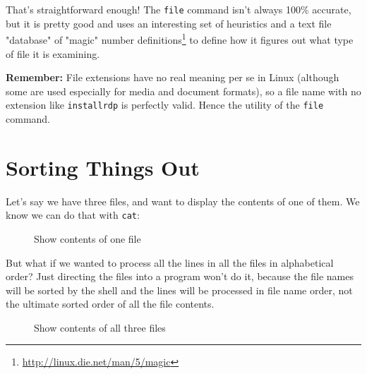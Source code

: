 \documentclass[10pt,american,]{book}
\makeatletter
\newenvironment{Shaded}{\begin{snugshade}}{\end{snugshade}}
\newcommand{\KeywordTok}[1]{\textcolor[rgb]{0.13,0.29,0.53}{\textbf{{#1}}}}
\newcommand{\NormalTok}[1]{{#1}}
\renewcommand{\href}[2]{#2\footnote{\url{#1}}}
\numberwithin{figure}{chapter}
\DeclareRobustCommand{\drcap}[1]{\begin{figure}[H]\caption{#1}\end{figure}}
\DeclareRobustCommand{\drcmd}[1]{
    \index{commands!#1@\texttt{#1}}
}
\renewcommand{\KeywordTok}[1]{{#1}}
\renewcommand{\NormalTok}[1]{{#1}}
\makeatother
\begin{document}
That's straightforward enough! The \texttt{file} command isn't always
100\% accurate, but it is pretty good and uses an interesting set of
heuristics and a text file "database" of
\href{http://linux.die.net/man/5/magic}{"magic" number definitions} to
define how it figures out what type of file it is examining.

\textbf{Remember:} File extensions have no real meaning per se in Linux
(although some are used especially for media and document formats), so a
file name with no extension like \texttt{installrdp} is perfectly valid.
Hence the utility of the \texttt{file} command.

\section*{Sorting Things Out}\label{sorting-things-out}

Let's say we have three files, and want to display the contents of one
of them. We know we can do that with \texttt{cat}: \drcmd{cat}

\drcap{Show contents of one file}

\begin{Shaded}
\end{Shaded}

But what if we wanted to process all the lines in all the files in
alphabetical order? Just directing the files into a program won't do it,
because the file names will be sorted by the shell and the lines will be
processed in file name order, not the ultimate sorted order of all the
file contents.

\drcap{Show contents of all three files}

\begin{Shaded}
\end{Shaded}
\end{document}

